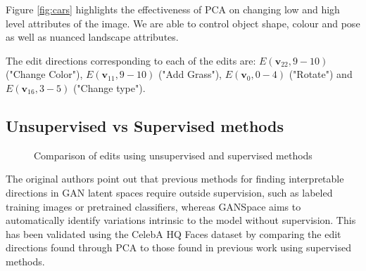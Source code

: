 \documentclass{article}
\begin{document}
Figure \ref{fig:cars} highlights the effectiveness of PCA on changing low and high level attributes of the image. We are able to control object shape, colour and pose as well as nuanced landscape attributes.

The edit directions corresponding to each of the edits are: $E(\textbf{v}_{22}, 9-10)$ ("Change Color"), $E(\textbf{v}_{11}, 9-10)$ ("Add Grass"), $E(\textbf{v}_{0}, 0-4)$ ("Rotate") and $E(\textbf{v}_{16}, 3-5)$ ("Change type").

\subsection{Unsupervised vs Supervised methods}

\begin{figure}[H]



\caption{Comparison of edits using unsupervised and supervised methods}

\end{figure}

The original authors point out that previous methods for finding interpretable directions in GAN latent spaces require outside supervision, such as labeled training images or pretrained classifiers, whereas GANSpace aims to automatically identify variations intrinsic to the model without supervision. This has been validated using the CelebA HQ Faces dataset by comparing the edit directions found through PCA to those found in previous work using supervised methods.
\end{document}
